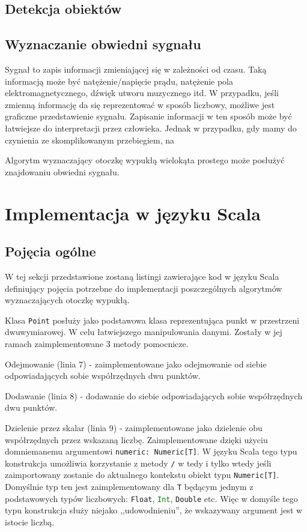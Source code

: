 		\section{Detekcja obiektów}
        \section{Wyznaczanie obwiedni sygnału}
        Sygnał to zapis informacji zmieniającej się w zależności od czasu. Taką informacją może być natężenie/napięcie prądu, natężenie pola elektromagnetycznego, dźwięk utworu muzycznego itd. W przypadku, jeśli zmienną informację da się  reprezentować w sposób liczbowy, możliwe jest graficzne przedstawienie sygnału. Zapisanie informacji w ten sposób może być łatwiejsze do interpretacji przez człowieka. Jednak w przypadku, gdy mamy do czynienia ze skomplikowanym przebiegiem, na
        
        Algorytm wyznaczający otoczkę wypukłą wielokąta prostego może posłużyć znajdowaniu obwiedni sygnału.
        
   \chapter{Implementacja w języku Scala}
   		\section{Pojęcia ogólne}
   		W tej sekcji przedstawione zostaną listingi zawierające kod w języku Scala definiujący pojęcia potrzebne do implementacji poszczególnych algorytmów wyznaczających otoczkę wypukłą.
   		
   		Klasa \texttt{Point} posłuży jako podstawowa klasa reprezentująca punkt w przestrzeni dwuwymiarowej. W celu łatwiejszego manipulowania danymi. Zostały w jej ramach zaimplementowane 3 metody pomocnicze.
   		
   		Odejmowanie (linia 7) - zaimplementowane jako odejmowanie od siebie odpowiadających sobie współrzędnych dwu punktów.
   		
   		Dodawanie (linia 8) - dodawanie do siebie odpowiadających sobie współrzędnych dwu punktów.
   		
   		Dzielenie przez skalar (linia 9) - zaimplementowane jako dzielenie obu współrzędnych przez wskazaną liczbę. Zaimplementowane dzięki użyciu domniemanemu argumentowi \texttt{numeric: Numeric[T]}. W języku Scala tego typu konstrukcja umożliwia korzystanie z metody \texttt{/} w tedy i tylko wtedy jeśli zaimportowany zostanie do aktualnego kontekstu obiekt typu \texttt{Numeric[T]}. Domyślnie typ ten jest zaimplementowany dla \texttt{T} będącym jednym z podstawowych typów liczbowych: \lstinline[language=scala]{Float}, \lstinline[language=scala]{Int}, \lstinline[language=scala]{Double} etc. Więc w domyśle tego typu konstrukcja służy niejako ,,udowodnieniu'', że wskazywany argument jest w istocie liczbą.
   		
